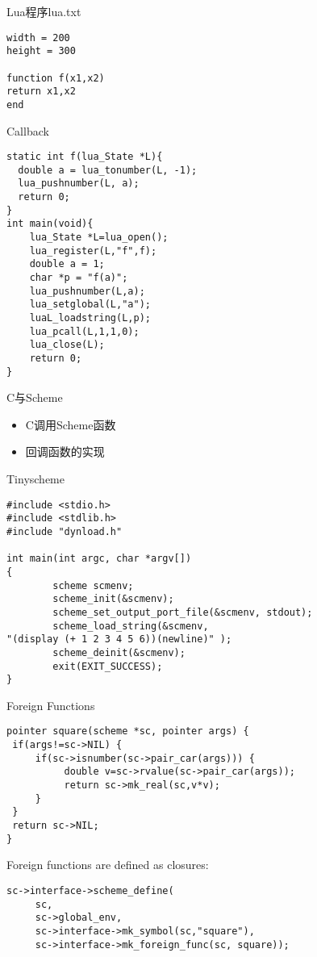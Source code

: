 \begin{frame}[containsverbatim]{Lua程序lua.txt}
\lstset{language=c}
\begin{lstlisting}
width = 200
height = 300

function f(x1,x2)
return x1,x2
end
\end{lstlisting}
\end{frame}


\begin{frame}[containsverbatim]{Callback}
\lstset{language=c}
\begin{lstlisting}
static int f(lua_State *L){
  double a = lua_tonumber(L, -1);
  lua_pushnumber(L, a);
  return 0;
}
int main(void){
    lua_State *L=lua_open();
    lua_register(L,"f",f);
    double a = 1;
    char *p = "f(a)";
    lua_pushnumber(L,a);
    lua_setglobal(L,"a");
    luaL_loadstring(L,p);
    lua_pcall(L,1,1,0);
    lua_close(L);
    return 0;
}
\end{lstlisting}
\end{frame}


\begin{frame}{C与Scheme}
\begin{itemize}
\item C调用Scheme函数
\item 回调函数的实现
\end{itemize}
\end{frame}

\begin{frame}[containsverbatim]{Tinyscheme}
\lstset{language=c}
\begin{lstlisting}
#include <stdio.h>
#include <stdlib.h>
#include "dynload.h"

int main(int argc, char *argv[])
{
        scheme scmenv;
        scheme_init(&scmenv);
        scheme_set_output_port_file(&scmenv, stdout);
        scheme_load_string(&scmenv,
"(display (+ 1 2 3 4 5 6))(newline)" );
        scheme_deinit(&scmenv);
        exit(EXIT_SUCCESS);
}
\end{lstlisting}
\end{frame}

\begin{frame}[containsverbatim]{Foreign Functions}
\begin{lstlisting}
pointer square(scheme *sc, pointer args) {
 if(args!=sc->NIL) {
     if(sc->isnumber(sc->pair_car(args))) {
          double v=sc->rvalue(sc->pair_car(args));
          return sc->mk_real(sc,v*v);
     }
 }
 return sc->NIL;
}
\end{lstlisting}

Foreign functions are defined as closures: 

\begin{lstlisting}
sc->interface->scheme_define( 
     sc, 
     sc->global_env, 
     sc->interface->mk_symbol(sc,"square"), 
     sc->interface->mk_foreign_func(sc, square)); 
\end{lstlisting}
\end{frame}

